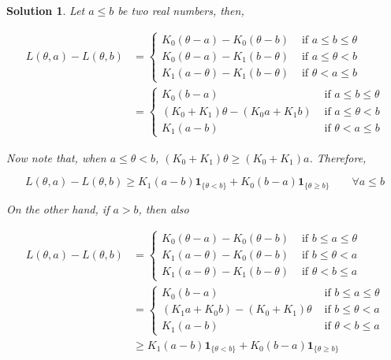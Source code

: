 \documentclass[12pt]{article}
\theoremstyle{problemstyle}
\newtheorem*{solution*}{Solution}
\newcommand{\ind}[1]{\mathbf{1}_{ \{#1\} }}
\begin{document}
\begin{solution*}
    Let $a \leq b$ be two real numbers, then,

    \begin{align*}
        L(\theta, a) - L(\theta, b) 
        & = \begin{cases}
            K_0 (\theta - a) - K_0(\theta - b) & \text{ if } a \leq b \leq \theta \\
            K_0 (\theta - a) -K_1(b - \theta) & \text{ if } a \leq \theta < b\\
            K_1(a - \theta) - K_1(b - \theta) & \text{ if } \theta < a \leq b
        \end{cases}\\
        & = \begin{cases}
            K_0 (b - a) & \text{ if } a \leq b \leq \theta \\
            (K_0 + K_1) \theta - (K_0 a + K_1 b) & \text{ if } a \leq \theta < b\\
            K_1(a - b) & \text{ if } \theta < a \leq b
        \end{cases} 
    \end{align*}

    Now note that, when $a \leq \theta < b$, $(K_0 + K_1) \theta \geq (K_0 + K_1)a$. Therefore, 

    \begin{equation*}
        L(\theta, a) - L(\theta, b) \geq K_1(a - b) \ind{\theta < b} + K_0 (b - a) \ind{\theta \geq b} \qquad \forall a \leq b        
    \end{equation*}
    

    On the other hand, if $a > b$, then also 

    \begin{align*}
        L(\theta, a) - L(\theta, b) 
        & = \begin{cases}
            K_0 (\theta - a) - K_0(\theta - b) & \text{ if } b \leq a \leq \theta \\
            K_1 (a - \theta) -K_0(\theta - b) & \text{ if } b \leq \theta < a\\
            K_1(a - \theta) - K_1(b - \theta) & \text{ if } \theta < b \leq a
        \end{cases}\\
        & = \begin{cases}
            K_0 (b - a) & \text{ if } b \leq a \leq \theta \\
            (K_1 a + K_0 b) - (K_0 + K_1) \theta & \text{ if } b \leq \theta < a\\
            K_1(a - b) & \text{ if } \theta < b \leq a
        \end{cases} \\
        & \geq K_1(a - b) \ind{\theta < b} + K_0 (b - a) \ind{\theta \geq b}
    \end{align*}


\end{solution*}
\end{document}
